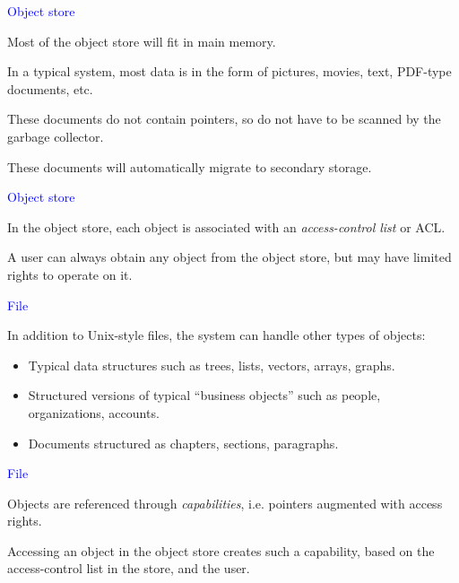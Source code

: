 \documentclass{slides}
\newcommand{\ti}[1]{\begin{center}\Large{\textcolor{blue}{#1}}\end{center}}
\begin{document}
\begin{slide}\ti{Object store}

Most of the object store will fit in main memory.

In a typical system, most data is in the form of pictures, movies,
text, PDF-type documents, etc.

These documents do not contain pointers, so do not have to be scanned
by the garbage collector.

These documents will automatically migrate to secondary storage.

\vfill\end{slide}
\begin{slide}\ti{Object store}

In the object store, each object is associated with an
\emph{access-control list} or ACL.

A user can always obtain any object from the object store, but may
have limited rights to operate on it.

\vfill\end{slide}
\begin{slide}\ti{File}

In addition to Unix-style files, the system can handle other types of
objects:

\begin{itemize}
\item Typical data structures such as trees, lists, vectors, arrays,
  graphs.
\item Structured versions of typical ``business objects'' such as
  people, organizations, accounts.
\item Documents structured as chapters, sections, paragraphs.
\end{itemize}

\vfill\end{slide}
\begin{slide}\ti{File}

Objects are referenced through \emph{capabilities}, i.e. pointers
augmented with access rights.

Accessing an object in the object store creates such a capability,
based on the access-control list in the store, and the user.

\vfill\end{slide}
\end{document}
